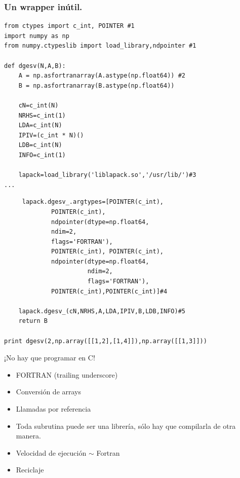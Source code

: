 \documentclass{beamer}
\begin{document}
\begin{frame}[containsverbatim]
 \frametitle{Un wrapper inútil.}
\begin{verbatim}
from ctypes import c_int, POINTER #1
import numpy as np
from numpy.ctypeslib import load_library,ndpointer #1

def dgesv(N,A,B):
    A = np.asfortranarray(A.astype(np.float64)) #2
    B = np.asfortranarray(B.astype(np.float64))

    cN=c_int(N)
    NRHS=c_int(1)
    LDA=c_int(N)
    IPIV=(c_int * N)()
    LDB=c_int(N)
    INFO=c_int(1)

    lapack=load_library('liblapack.so','/usr/lib/')#3
...
\end{verbatim}
\end{frame}

\begin{frame}[containsverbatim]
 \begin{verbatim}
     lapack.dgesv_.argtypes=[POINTER(c_int),
             POINTER(c_int),
             ndpointer(dtype=np.float64,
             ndim=2,
             flags='FORTRAN'),
             POINTER(c_int), POINTER(c_int),
             ndpointer(dtype=np.float64,
                       ndim=2,
                       flags='FORTRAN'),
             POINTER(c_int),POINTER(c_int)]#4

    lapack.dgesv_(cN,NRHS,A,LDA,IPIV,B,LDB,INFO)#5
    return B

print dgesv(2,np.array([[1,2],[1,4]]),np.array([[1,3]]))
\end{verbatim}
\end{frame}

\begin{frame}
 \begin{center}
  \begin{huge}
   ¡No hay que programar en C!
  \end{huge}
 \end{center}
\vspace{2cm}
\begin{itemize}
 \item FORTRAN (trailing underscore)
 \item Conversión de arrays
 \item Llamadas por referencia
 \item Toda subrutina puede ser una librería, sólo hay que compilarla de otra manera.
 \item Velocidad de ejecución $\sim$ Fortran
 \item Reciclaje
\end{itemize}
\end{frame}
\end{document}
